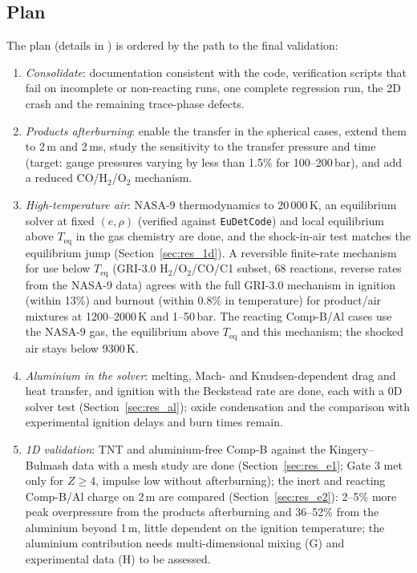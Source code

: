 \documentclass{article}
\begin{document}
\subsection{Plan}

The plan (details in ) is ordered by the path to the final validation:
\begin{enumerate}
    \item[A.] \emph{Consolidate}: documentation consistent with the code, verification scripts that fail on incomplete or non-reacting runs, one complete regression run, the 2D crash and the remaining trace-phase defects.
    \item[B.] \emph{Products afterburning}: enable the transfer in the spherical cases, extend them to 2\,m and 2\,ms, study the sensitivity to the transfer pressure and time (target: gauge pressures varying by less than 1.5\% for 100--200\,bar), and add a reduced CO/H$_2$/O$_2$ mechanism.
    \item[C.] \emph{High-temperature air}: NASA-9 thermodynamics to 20\,000\,K, an equilibrium solver at fixed $(e, \rho)$ (verified against \texttt{EuDetCode}) and local equilibrium above $T_\text{eq}$ in the gas chemistry are done, and the shock-in-air test matches the equilibrium jump (Section~\ref{sec:res_1d}). A reversible finite-rate mechanism for use below $T_\text{eq}$ (GRI-3.0 H$_2$/O$_2$/CO/C1 subset, 68 reactions, reverse rates from the NASA-9 data) agrees with the full GRI-3.0 mechanism in ignition (within 13\%) and burnout (within 0.8\% in temperature) for product/air mixtures at 1200--2000\,K and 1--50\,bar. The reacting Comp-B/Al cases use the NASA-9 gas, the equilibrium above $T_\text{eq}$ and this mechanism; the shocked air stays below 9300\,K.
    \item[D.] \emph{Aluminium in the solver}: melting, Mach- and Knudsen-dependent drag and heat transfer, and ignition with the Beckstead rate are done, each with a 0D solver test (Section~\ref{sec:res_al}); oxide condensation and the comparison with experimental ignition delays and burn times remain.
    \item[E.] \emph{1D validation}: TNT and aluminium-free Comp-B against the Kingery--Bulmash data with a mesh study are done (Section~\ref{sec:res_e1}; Gate 3 met only for $Z \ge 4$, impulse low without afterburning); the inert and reacting Comp-B/Al charge on 2\,m are compared (Section~\ref{sec:res_e2}): 2--5\% more peak overpressure from the products afterburning and 36--52\% from the aluminium beyond 1\,m, little dependent on the ignition temperature; the aluminium contribution needs multi-dimensional mixing (G) and experimental data (H) to be assessed.

\end{enumerate}
\end{document}
